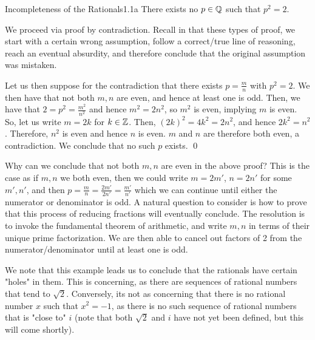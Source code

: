 \begin{example}{Incompleteness of the Rationals}{1.1a}
    There exists no $p \in \mathbb{Q}$ such that $p^2 = 2$.
\end{example}
We proceed via proof by contradiction. Recall in that these types of proof, we start with a certain wrong assumption, follow a correct/true line of reasoning, reach an eventual absurdity, and therefore conclude that the original assumption was mistaken. 
\begin{nproof}
    Let us then suppose for the contradiction that there exists $p = \frac{m}{n}$ with $p^2 = 2$. We then have that not both $m, n$ are even, and hence at least one is odd. Then, we have that $2 = p^2 = \frac{m^2}{n^2}$ and hence $m^2 = 2n^2$, so $m^2$ is even, implying $m$ is even. So, let us write $m = 2k$ for $k \in \mathbb{Z}$. Then, $(2k)^2 = 4k^2 = 2n^2$, and hence $2k^2 = n^2$. Therefore, $n^2$ is even and hence $n$ is even. $m$ and $n$ are therefore both even, a contradiction. We conclude that no such $p$ exists. \qed
\end{nproof}
Why can we conclude that not both $m, n$ are even in the above proof? This is the case as if $m, n$ we both even, then we could write $m = 2m'$, $n = 2n'$ for some $m', n'$, and then $p = \frac{m}{n} = \frac{2m'}{2n'} = \frac{m'}{n'}$ which we can continue until either the numerator or denominator is odd. A natural question to consider is how to prove that this process of reducing fractions will eventually conclude. The resolution is to invoke the fundamental theorem of arithmetic, and write $m, n$ in terms of their unique prime factorization. We are then able to cancel out factors of 2 from the numerator/denominator until at least one is odd.

We note that this example leads us to conclude that the rationals have certain "holes" in them. This is concerning, as there are sequences of rational numbers that tend to $\sqrt{2}$. Conversely, its not as concerning that there is no rational number $x$ such that $x^2 = -1$, as there is no such sequence of rational numbers that is "close to" $i$ (note that both $\sqrt{2}$ and $i$ have not yet been defined, but this will come shortly).

\setcounter{rudin}{0}

